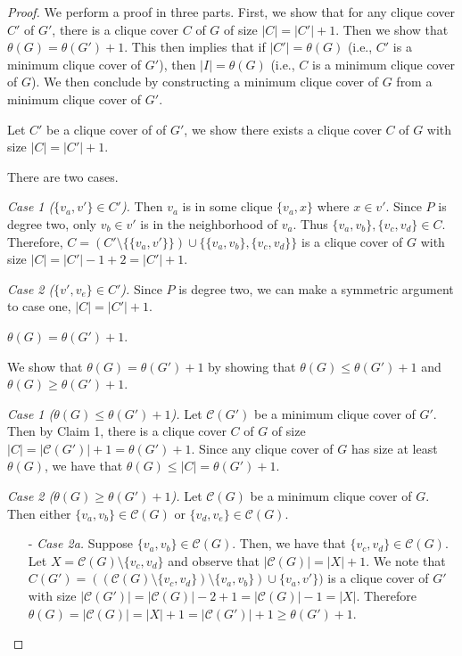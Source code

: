 \documentclass[../techreport.tex]{subfiles}
\begin{document}
\begin{proof}
	We perform a proof in three parts. First, we show that for any clique cover $C'$ of $G'$, there is a clique cover $C$ of $G$ of size $|C| = |C'| + 1$. Then we show that $\theta(G) = \theta(G') + 1$. This then implies that if $|C'| = \theta(G)$ (i.e., $C'$ is a minimum clique cover of $G'$), then $|I| = \theta(G)$ (i.e., $C$ is a minimum clique cover of $G$). We then conclude by constructing a minimum clique cover of $G$ from a minimum clique cover of $G'$.

	\begin{claim} 
		Let $C'$ be a clique cover of of $G'$, we show there exists a clique cover $C$ of $G$ with size $|C| = |C'| + 1$.
	\end{claim}
	There are two cases.

	\noindent\emph{Case 1 ($\{v_a, v'\} \in C'$).} Then $v_a$ is in some clique $\{v_a, x\}$ where $x \in v'$. Since $P$ is degree two, only $v_b \in v'$ is in the neighborhood of $v_a$. Thus $\{v_a, v_b\}, \{v_c, v_d\} \in C$. Therefore, $C = (C' \setminus \{\{v_a, v'\}\}) \cup \{\{v_a, v_b\}, \{v_c, v_d\}\}$ is a clique cover of $G$ with size $|C| = |C'| - 1 + 2 = |C'| + 1$.

	\noindent\emph{Case 2 ($\{v', v_e\} \in C'$).} Since $P$ is degree two, we can make a symmetric argument to case one, $|C| = |C'| + 1$.

	\begin{claim}
		$\theta(G) = \theta(G') + 1$.
	\end{claim}
	We show that $\theta(G) = \theta(G') + 1$ by showing that $\theta(G) \leq \theta(G') + 1$ and $\theta(G) \geq \theta(G') + 1$.

	\noindent\emph{Case 1 ($\theta(G) \leq \theta(G') + 1$).} Let $\mathcal{C}(G')$ be a minimum clique cover of $G'$. Then by Claim 1, there is a clique cover $C$ of $G$ of size $|C| = |\mathcal{C}(G')| + 1 = \theta(G') + 1$. Since any clique cover of $G$ has size at least $\theta(G)$, we have that $\theta(G) \leq |C| = \theta(G') + 1$. 

	\noindent\emph{Case 2 ($\theta(G) \geq \theta(G') + 1$).} Let $\mathcal{C}(G)$ be a minimum clique cover of $G$. Then either $\{v_a, v_b\} \in \mathcal{C}(G)$ or $\{v_d, v_e\} \in \mathcal{C}(G)$.
	\begin{itemize}
		\item[-]\emph{Case 2a.} Suppose $\{v_a, v_b\} \in \mathcal{C}(G)$. Then, we have that $\{v_c, v_d\} \in \mathcal{C}(G)$. Let $X = \mathcal{C}(G) \setminus \{v_c, v_d\}$ and observe that $|\mathcal{C}(G)| = |X| + 1$. We note that $C(G') = ((\mathcal{C}(G) \setminus \{v_c, v_d\}) \setminus \{v_a, v_b\}) \cup \{v_a, v'\})$ is a clique cover of $G'$ with size $|\mathcal{C}(G')| = |\mathcal{C}(G)| - 2 + 1 = |\mathcal{C}(G)| - 1 = |X|$. Therefore $\theta(G) = |\mathcal{C}(G)| = |X| + 1 = |\mathcal{C}(G')| + 1 \geq \theta(G') + 1$.


\end{itemize}
\end{proof}
\end{document}
